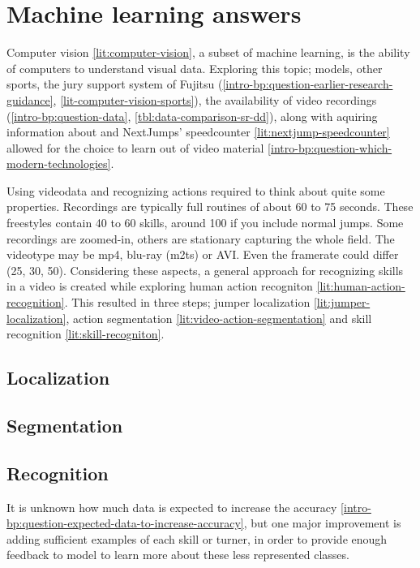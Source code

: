 \section{Machine learning answers}
\label{ch:machine-learning-answers}

Computer vision \ref{lit:computer-vision}, a subset of machine learning, is the ability of computers to understand visual data.
Exploring this topic; models, other sports, the jury support system of Fujitsu (\ref{intro-bp:question-earlier-research-guidance}, \ref{lit-computer-vision-sports}), the availability of video recordings (\ref{intro-bp:question-data}, \ref{tbl:data-comparison-sr-dd}), along with aquiring information about and NextJumps' speedcounter \ref{lit:nextjump-speedcounter} allowed for the choice to learn out of video material \ref{intro-bp:question-which-modern-technologies}.

Using videodata and recognizing actions required to think about quite some properties. Recordings are typically full routines of about 60 to 75 seconds. These freestyles contain 40 to 60 skills, around 100 if you include normal jumps. Some recordings are zoomed-in, others are stationary capturing the whole field. The videotype may be mp4, blu-ray (m2ts) or AVI. Even the framerate could differ (25, 30, 50).
Considering these aspects, a general approach for recognizing skills in a video is created while exploring human action recogniton \ref{lit:human-action-recognition}. This resulted in three steps; jumper localization \ref{lit:jumper-localization}, action segmentation \ref{lit:video-action-segmentation} and skill recognition \ref{lit:skill-recogniton}.


\subsection{Localization}

\subsection{Segmentation}

\subsection{Recognition}

It is unknown how much data is expected to increase the accuracy \ref{intro-bp:question-expected-data-to-increase-accuracy}, but one major improvement is adding sufficient examples of each skill or turner, in order to provide enough feedback to model to learn more about these less represented classes.

